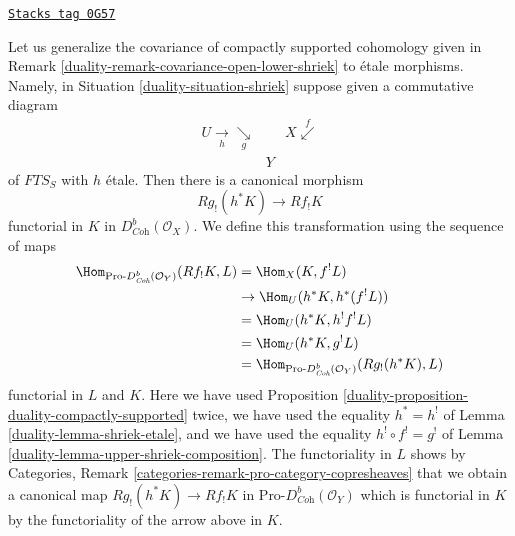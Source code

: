 \begin{remark}
\label{duality-remark-covariance-etale-lower-shriek}
\href{https://stacks.math.columbia.edu/tag/0G57}{\texttt{Stacks tag 0G57}}

Let us generalize the covariance of compactly supported cohomology
given in Remark \ref{duality-remark-covariance-open-lower-shriek}
to \'etale morphisms. Namely, in Situation \ref{duality-situation-shriek}
suppose given a commutative diagram
$$
\begin{array}{ccc}U \underset{h}{\longrightarrow}\underset{g}{\searrow} &  & X \overset{f}{\swarrow} \\  & Y & \end{array}
$$
of $\textit{FTS}_S$ with $h$ \'etale. Then there is a canonical morphism
$$
Rg_!(h^*K) \longrightarrow Rf_!K
$$
functorial in $K$ in $D^b_{\textit{Coh}}(\mathcal{O}_X)$. We define
this transformation using the sequence of maps
\begin{align*}
\Hom_{\text{Pro-}D^b_{\textit{Coh}}(\mathcal{O}_Y)}(Rf_!K, L)
& =
\Hom_X(K, f^!L) \\
& \to
\Hom_U(h^*K, h^*(f^!L)) \\
& =
\Hom_U(h^*K, h^!f^!L) \\
& =
\Hom_U(h^*K, g^!L) \\
& =
\Hom_{\text{Pro-}D^b_{\textit{Coh}}(\mathcal{O}_Y)}(Rg_!(h^*K), L)
\end{align*}
functorial in $L$ and $K$. Here we have used
Proposition \ref{duality-proposition-duality-compactly-supported}
twice, we have used the equality $h^* = h^!$ of
Lemma \ref{duality-lemma-shriek-etale}, and we have used the equality
$h^! \circ f^! = g^!$ of Lemma \ref{duality-lemma-upper-shriek-composition}.
The functoriality in $L$ shows by
Categories, Remark \ref{categories-remark-pro-category-copresheaves}
that we obtain a canonical map $Rg_!(h^*K) \to Rf_!K$ in
$\text{Pro-}D^b_{\textit{Coh}}(\mathcal{O}_Y)$ which is
functorial in $K$ by the functoriality of the arrow above in $K$.
\end{remark}

